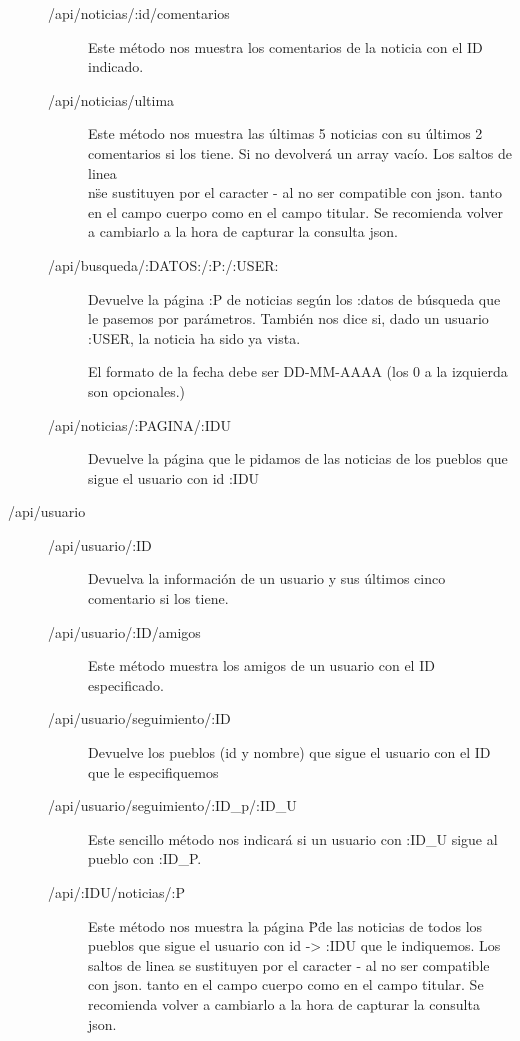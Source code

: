 \begin{description}
\begin{description}
\item[/api/noticias/:id/comentarios]
Este método nos muestra los comentarios de la noticia con el ID indicado.

\item[/api/noticias/ultima]
Este método nos muestra las últimas 5 noticias con su últimos 2 comentarios si los tiene. Si no devolverá un array vacío. Los saltos de linea \"\\n\" se sustituyen por el caracter - al no ser compatible con json. tanto en el campo cuerpo como en el campo titular. Se recomienda volver a cambiarlo a la hora de capturar la consulta json.


\item[/api/busqueda/:DATOS:/:P:/:USER:]
Devuelve la página :P de noticias según los :datos de búsqueda que le pasemos por parámetros. También nos dice si, dado un usuario :USER, la noticia ha sido ya vista.

El formato de la fecha debe ser DD-MM-AAAA (los 0 a la izquierda son opcionales.)

\item[/api/noticias/:PAGINA/:IDU] 

Devuelve la página que le pidamos de las noticias de los pueblos que sigue el usuario con id :IDU
\end{description}

\item[/api/usuario]
\begin{description}
\item[/api/usuario/:ID]
Devuelva la información de un usuario y sus últimos cinco comentario si los tiene.

\item[/api/usuario/:ID/amigos]
Este método muestra los amigos de un usuario con el ID especificado.

\item[/api/usuario/seguimiento/:ID]
Devuelve los pueblos (id y nombre) que sigue el usuario con el ID que le especifiquemos

\item[/api/usuario/seguimiento/:ID\_p/:ID\_U}]
Este sencillo método nos indicará si un usuario con :ID\_U sigue al pueblo con :ID\_P.

\item[/api/:IDU/noticias/:P] 
Este método nos muestra la página \"P\" de las noticias de todos los pueblos que sigue el usuario con id -> :IDU que le indiquemos. Los saltos de linea se sustituyen por el caracter - al no ser compatible con json. tanto en el campo cuerpo como en el campo titular. Se recomienda volver a cambiarlo a la hora de capturar la consulta json.



\end{description}
\end{description}
